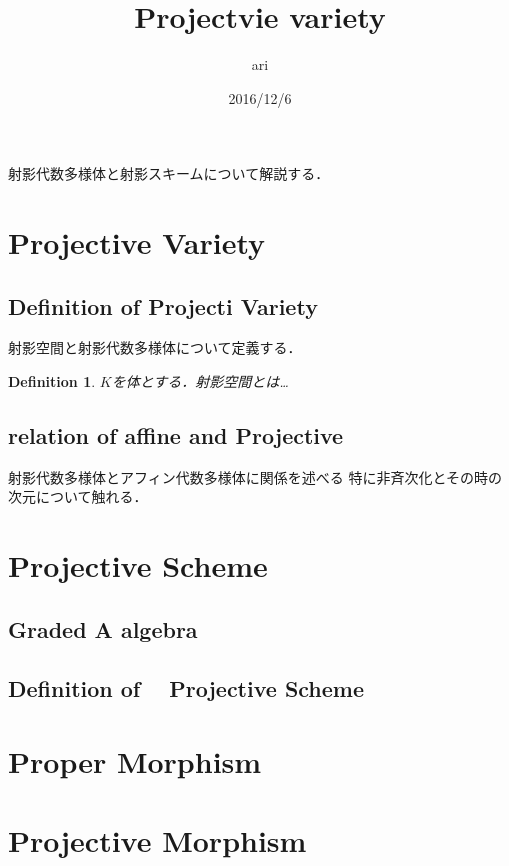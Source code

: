 \documentclass{ujarticle}
\author{ari}
\title{Projectvie variety}
\date{2016/12/6}
\newtheorem{dfn}[thm]{Definition}
\begin{document}
\maketitle
\tableofcontents

射影代数多様体と射影スキームについて解説する．

\section{Projective Variety}
\label{sec:Projective Variety}

\subsection{Definition of Projecti Variety}
\label{sub:Definition of Projecti Variety}

射影空間と射影代数多様体について定義する．
\begin{dfn}
 $K$を体とする．射影空間とは…
\end{dfn}

\subsection{relation of affine and Projective}
\label{sub:relation of affine and Projective}
射影代数多様体とアフィン代数多様体に関係を述べる
特に非斉次化とその時の次元について触れる．

\section{Projective Scheme}
\label{sec:Projective Scheme}


\subsection{Graded A algebra}
\label{sec:Graded A algebra}

\subsection{Definition of　 Projective Scheme}
\label{sub:Definition of Projective Scheme}

\section{Proper Morphism}
\label{sec:Proper Morphism}

\section{Projective Morphism}
\label{sec:Projective Morphism}
\end{document}
